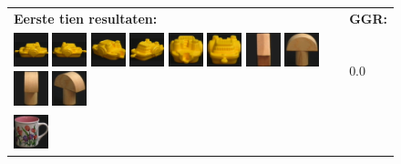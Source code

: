 {\begin{figure}[p]
\vspace{5pt}
\centering
\begin{tabular}{m{11cm} | m{3cm} |}
\textbf{Eerste tien resultaten:} & \textbf{GGR:} \\
\vspace{4pt}
\includegraphics[width=1cm]{coil/beeld-12.eps}
\includegraphics[width=1cm]{coil/beeld-13.eps}
\includegraphics[width=1cm]{coil/beeld-16.eps}
\includegraphics[width=1cm]{coil/beeld-15.eps}
\includegraphics[width=1cm]{coil/beeld-17.eps}
\includegraphics[width=1cm]{coil/beeld-14.eps}
\includegraphics[width=1cm]{coil/beeld-44.eps}
\includegraphics[width=1cm]{coil/beeld-1.eps}
\includegraphics[width=1cm]{coil/beeld-5.eps}
\includegraphics[width=1cm]{coil/beeld-4.eps}
& {\scriptsize 0.0}
\\
\includegraphics[width=1cm]{coil/beeld-6.eps}

\end{tabular}
\end{figure}}
